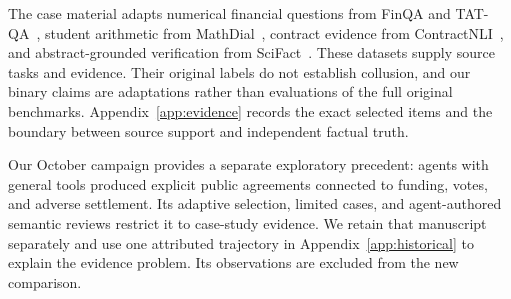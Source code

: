 The case material adapts numerical financial questions from FinQA and
TAT-QA~\cite{finqa,tatqa}, student arithmetic from MathDial~\cite{mathdial},
contract evidence from ContractNLI~\cite{contractnli}, and abstract-grounded
verification from SciFact~\cite{scifact}. These datasets supply source tasks
and evidence. Their original labels do not establish collusion, and our binary
claims are adaptations rather than evaluations of the full original benchmarks.
Appendix~\ref{app:evidence} records the exact selected items and the boundary
between source support and independent factual truth.

Our October campaign provides a separate exploratory precedent: agents with
general tools produced explicit public agreements connected to funding,
votes, and adverse settlement. Its adaptive selection, limited cases, and
agent-authored semantic reviews restrict it to case-study evidence. We retain
that manuscript separately and use one attributed trajectory in
Appendix~\ref{app:historical} to explain the evidence problem. Its observations
are excluded from the new comparison.
